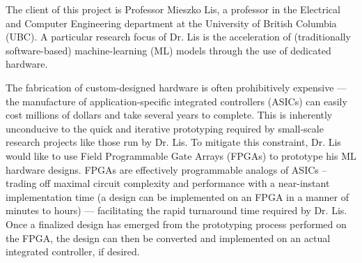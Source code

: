 The client of this project is Professor Mieszko Lis, a professor in the Electrical and Computer Engineering department at the University of British Columbia (UBC). A particular research focus of Dr. Lis is the acceleration of (traditionally software-based) machine-learning (ML) models through the use of dedicated hardware. 

The fabrication of custom-designed hardware is often prohibitively expensive --- the manufacture of application-specific integrated controllers (ASICs) can easily cost millions of dollars and take several years to complete. This is inherently unconducive to the quick and iterative prototyping required by small-scale research projects like those run by Dr. Lis. To mitigate this constraint, Dr. Lis would like to use Field Programmable Gate Arrays (FPGAs) to prototype his ML hardware designs. FPGAs are effectively programmable analogs of ASICs -- trading off maximal circuit complexity and performance with a near-instant implementation time (a design can be implemented on an FPGA in a manner of minutes to hours) --- facilitating the rapid turnaround time required by Dr. Lis. Once a finalized design has emerged from the prototyping process performed on the FPGA, the design can then be converted and implemented on an actual integrated controller, if desired.